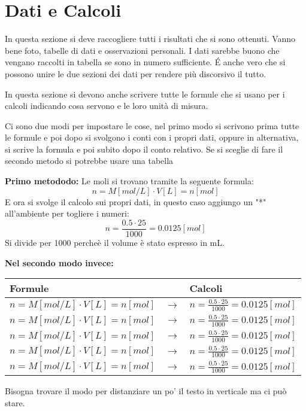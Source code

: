 \section{Dati e Calcoli}
In questa sezione si deve raccogliere tutti i risultati che si sono ottenuti. Vanno bene foto, tabelle di dati e osservazioni personali. I dati sarebbe buono che vengano raccolti in tabella se sono in numero sufficiente. 
\'E anche vero che si possono unire le due sezioni dei dati per rendere più discorsivo il tutto.

In questa sezione si devono anche scrivere tutte le formule che si usano per i calcoli indicando cosa servono e le loro unità di misura.

Ci sono due modi per impostare le cose, nel primo modo si scrivono prima tutte le formule e poi dopo si svolgono i conti con i propri dati, oppure in alternativa, si scrive la formula e poi subito dopo il conto relativo. Se si sceglie di fare il secondo metodo si potrebbe usare una tabella

\textbf{Primo metododo:}
Le moli si trovano tramite la seguente formula:
\begin{equation}
   n=M[mol/L]\cdot V[L]=n [mol] 
   \label{eq:mol} %
\end{equation}
E ora si svolge il calcolo sui propri dati, in questo caso aggiungo un "*" all'ambiente per togliere i numeri:
\begin{equation*}
   n=\frac{0.5\cdot 25}{1000}=0.0125 [mol] 
\end{equation*}
Si divide per  1000 percheè il volume è stato espresso in mL.

\textbf{Nel secondo modo invece:}
\begin{center}
    \begin{tabularx}{0.9\textwidth}{XcX}
    Formule & & Calcoli\\
    \midrule
    $n=M[mol/L]\cdot V[L]=n [mol] $ &$\rightarrow$& $ n=\frac{0.5\cdot 25}{1000}=0.0125 [mol] $\\
    $n=M[mol/L]\cdot V[L]=n [mol] $ &$\rightarrow$& $ n=\frac{0.5\cdot 25}{1000}=0.0125 [mol] $\\
    $n=M[mol/L]\cdot V[L]=n [mol] $ &$\rightarrow$& $ n=\frac{0.5\cdot 25}{1000}=0.0125 [mol] $\\
    $n=M[mol/L]\cdot V[L]=n [mol] $ &$\rightarrow$& $ n=\frac{0.5\cdot 25}{1000}=0.0125 [mol] $\\
    $n=M[mol/L]\cdot V[L]=n [mol] $ &$\rightarrow$& $ n=\frac{0.5\cdot 25}{1000}=0.0125 [mol] $\\
    \end{tabularx}
\end{center}
Bisogna trovare il modo per distanziare un po' il testo in verticale ma ci può stare.

